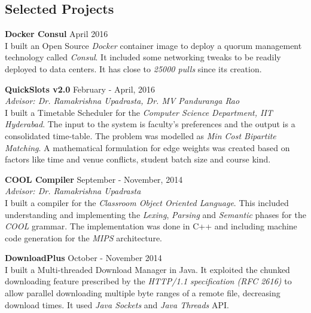 \documentclass[margin,line]{res}
\begin{document}
\begin{resume}
\section{\sc Selected Projects}

  {\bf Docker Consul} \hfill April 2016 \\
	I built an Open Source {\it Docker} container image to deploy a quorum management technology called {\it Consul}. It included some networking tweaks to be readily deployed to data centers. It has close to {\em 25000 pulls} since its creation.

  \vspace*{-2.5mm}

  {\bf QuickSlots v2.0} \hfill February - April, 2016 \\
  	{\it Advisor: Dr. Ramakrishna Upadrasta, Dr. MV Panduranga Rao} \vspace{0.15 \baselineskip} \\
    I built a Timetable Scheduler for the {\it Computer Science Department, IIT Hyderabad}. The input to the system is faculty's preferences and the output is a consolidated time-table. The problem was modelled as {\em Min Cost Bipartite Matching}. A mathematical formulation for edge weights was created based on factors like time and venue conflicts, student batch size and course kind.

  \vspace*{-2.5mm}

  {\bf COOL Compiler} \hfill September - November, 2014 \\
  	{\it Advisor: Dr. Ramakrishna Upadrasta} \vspace{0.15 \baselineskip} \\
  	I built a compiler for the {\it Classroom Object Oriented Language}. This included understanding and implementing the {\em Lexing}, {\em Parsing} and {\em Semantic} phases for the {\it COOL} grammar. The implementation was done in C++ and including machine code generation for the {\it MIPS} architecture.

  \vspace*{-2.5mm}

  {\bf DownloadPlus} \hfill October - November 2014 \\
  	I built a Multi-threaded Download Manager in Java. It exploited the chunked downloading feature prescribed by the {\it HTTP/1.1 specification (RFC 2616)} to allow parallel downloading multiple byte ranges of a remote file, decreasing download times. It used {\it Java Sockets} and {\it Java Threads} API.


\end{resume}
\end{document}
